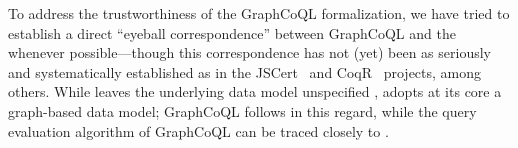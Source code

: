 


To address the trustworthiness of the GraphCoQL formalization, we have tried to establish a direct ``eyeball correspondence'' between GraphCoQL and the \spec{} whenever possible---though this correspondence has not (yet) been as seriously and systematically established as in the JSCert~\cite{jscert} and CoqR~\cite{coqr} projects, among others.
While \spec{} leaves the underlying data model unspecified , 
\HP{} adopts at its core a graph-based data model; GraphCoQL follows \HP{} in this regard, while the query evaluation algorithm of GraphCoQL can be traced closely to \spec{}.


